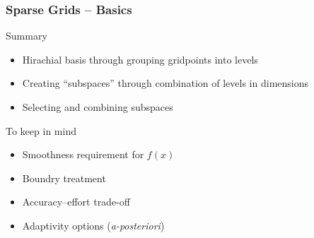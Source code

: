 \begin{frame}
  \frametitle{Sparse Grids -- Basics}
  \topline
  \vspace{-10px}
  \begin{block}{Summary}
    \begin{itemize}
      \item Hirachial basis through grouping gridpoints into levels
      \item Creating ``subspaces'' through combination of levels in dimensions
      \item Selecting and combining subspaces
      \end{itemize}
  \end{block}
  \begin{block}{To keep in mind}
    \begin{itemize}
      \item Smoothness requirement for $f(x)$
      \item Boundry treatment
      \item Accuracy--effort trade-off
      \item Adaptivity options (\emph{a-posteriori})
      \end{itemize}
  \end{block}
\end{frame}




